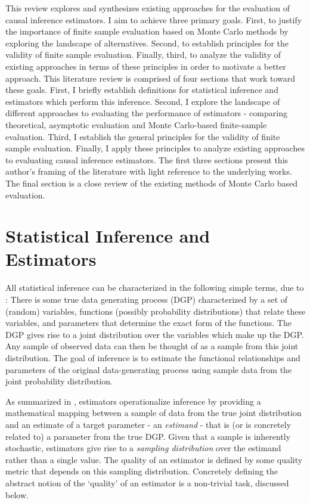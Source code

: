 \documentclass[../main.tex]{subfiles}
\begin{document}
This review explores and synthesizes existing approaches for the evaluation of causal inference estimators. I aim to achieve three primary goals. First, to justify the importance of finite sample evaluation based on Monte Carlo methods by exploring the landscape of alternatives. Second, to establish principles for the validity of finite sample evaluation. Finally, third, to analyze the validity of existing approaches in terms of these principles in order to motivate a better approach. This literature review is comprised of four sections that work toward these goals. First, I briefly establish definitions for statistical inference and estimators which perform this inference. Second, I explore the landscape of different approaches to evaluating the performance of estimators - comparing theoretical, asymptotic evaluation and Monte Carlo-based finite-sample evaluation. Third, I establish the general principles for the validity of finite sample evaluation. Finally, I apply these principles to analyze existing approaches to evaluating causal inference estimators. The first three sections present this author’s framing of the literature with light reference to the underlying works. The final section is a close review of the existing methods of Monte Carlo based evaluation.\par

\section{Statistical Inference and Estimators}

\vspace{\baselineskip}
All statistical inference can be characterized in the following simple terms, due to \textcite{Pearl2009CausalOverview}: There is some true data generating process (DGP) characterized by a set of (random) variables, functions (possibly probability distributions) that relate these variables, and parameters that determine the exact form of the functions. The DGP gives rise to a joint distribution over the variables which make up the DGP. Any sample of observed data can then be thought of as a sample from this joint distribution. The goal of inference is to estimate the functional relationships and parameters of the original data-generating process using sample data from the joint probability distribution.\par


\vspace{\baselineskip}
As summarized in \textcite{Calder1953StatisticalInference}, estimators operationalize inference by providing a mathematical mapping between a sample of data from the true joint distribution and an estimate of a target parameter - an \textit{estimand} - that is (or is concretely related to) a parameter from the true DGP. Given that a sample is inherently stochastic, estimators give rise to a \textit{sampling distribution }over the estimand rather than a single value. The quality of an estimator is defined by some quality metric that depends on this sampling distribution. Concretely defining the abstract notion of the ‘quality’ of an estimator is a non-trivial task, discussed below.\par
\end{document}
